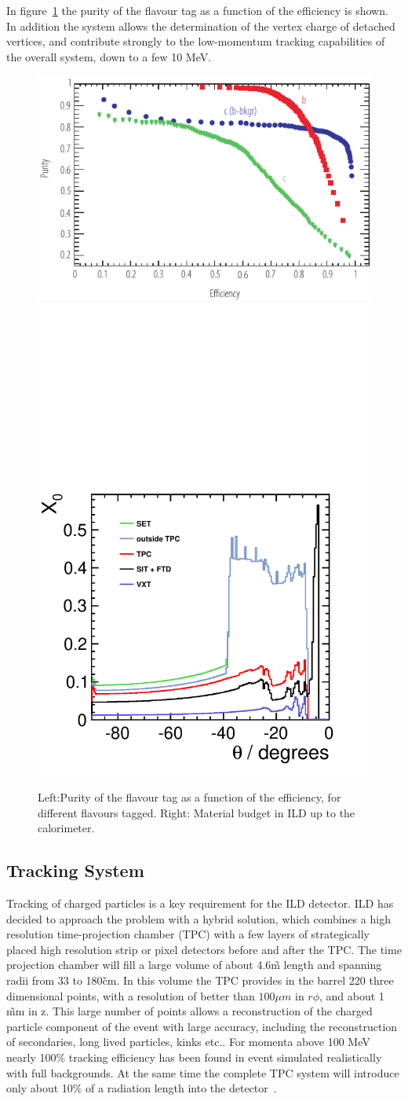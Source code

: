 \documentclass[%
 amsmath,amssymb,
 aps,
]{revtex4-1}
\begin{document}
In figure~\ref{fig-btag} the purity of the flavour tag as a function of the efficiency is shown. In addition the system allows the determination of the vertex charge of detached vertices, and contribute strongly to the low-momentum tracking capabilities of the overall system, down to a few 10 MeV. 
\begin{figure}
    \centering
    \includegraphics[width=0.45\hsize]{figures/FlavourTagPurities_Zpeak_DCR-eps-converted-to.pdf}
    \includegraphics[width=0.35\hsize]{figures/material-budget-new.pdf}
    \caption{Left:Purity of the flavour tag as a function of the efficiency, for different flavours tagged. Right: Material budget in ILD up to the calorimeter.}
    \label{fig-btag}
\end{figure}  

\subsection{Tracking System}

Tracking of charged particles is a key requirement for the ILD detector. ILD has decided to approach the problem with a hybrid solution, which combines a high resolution time-projection chamber (TPC) with a few layers of strategically placed high resolution strip or pixel detectors before and after the TPC. 
The time projection chamber will fill a large volume of about 4.6\~m length and spanning radii from 33 to 180\~cm. In this volume the TPC provides in the barrel 220 three dimensional points, with a resolution of better than $100 \mu m$ in $r \phi$, and about 1 \~mm in z. This large number of points allows a reconstruction of the charged particle component of the event with large accuracy, including the reconstruction of secondaries, long lived particles, kinks etc.. For momenta above 100 MeV nearly 100\% tracking efficiency has been found in event simulated realistically with full backgrounds. At the same time the complete TPC system will introduce only about 10\% of a radiation length into the detector~\cite{Diener:2012mc}. 
\end{document}

